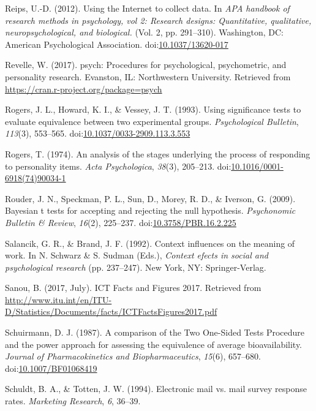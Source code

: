 \documentclass[english,man]{apa6}
\theoremstyle{definition}
\theoremstyle{definition}
\theoremstyle{definition}
\theoremstyle{remark}
\begin{document}
\hypertarget{ref-Reips2012}{}
Reips, U.-D. (2012). Using the Internet to collect data. In \emph{APA
handbook of research methods in psychology, vol 2: Research designs:
Quantitative, qualitative, neuropsychological, and biological.} (Vol. 2,
pp. 291--310). Washington, DC: American Psychological Association.
doi:\href{https://doi.org/10.1037/13620-017}{10.1037/13620-017}

\hypertarget{ref-Revelle2017}{}
Revelle, W. (2017). psych: Procedures for psychological, psychometric,
and personality research. Evanston, IL: Northwestern University.
Retrieved from \url{https://cran.r-project.org/package=psych}

\hypertarget{ref-Rogers1993}{}
Rogers, J. L., Howard, K. I., \& Vessey, J. T. (1993). Using
significance tests to evaluate equivalence between two experimental
groups. \emph{Psychological Bulletin}, \emph{113}(3), 553--565.
doi:\href{https://doi.org/10.1037/0033-2909.113.3.553}{10.1037/0033-2909.113.3.553}

\hypertarget{ref-Rogers1974}{}
Rogers, T. (1974). An analysis of the stages underlying the process of
responding to personality items. \emph{Acta Psychologica}, \emph{38}(3),
205--213.
doi:\href{https://doi.org/10.1016/0001-6918(74)90034-1}{10.1016/0001-6918(74)90034-1}

\hypertarget{ref-Rouder2009}{}
Rouder, J. N., Speckman, P. L., Sun, D., Morey, R. D., \& Iverson, G.
(2009). Bayesian t tests for accepting and rejecting the null
hypothesis. \emph{Psychonomic Bulletin \& Review}, \emph{16}(2),
225--237.
doi:\href{https://doi.org/10.3758/PBR.16.2.225}{10.3758/PBR.16.2.225}

\hypertarget{ref-Salancik1992}{}
Salancik, G. R., \& Brand, J. F. (1992). Context influences on the
meaning of work. In N. Schwarz \& S. Sudman (Eds.), \emph{Context efects
in social and psychological research} (pp. 237--247). New York, NY:
Springer-Verlag.

\hypertarget{ref-Sanou2017}{}
Sanou, B. (2017, July). ICT Facts and Figures 2017. Retrieved from
\url{http://www.itu.int/en/ITU-D/Statistics/Documents/facts/ICTFactsFigures2017.pdf}

\hypertarget{ref-Schuirmann1987}{}
Schuirmann, D. J. (1987). A comparison of the Two One-Sided Tests
Procedure and the power approach for assessing the equivalence of
average bioavailability. \emph{Journal of Pharmacokinetics and
Biopharmaceutics}, \emph{15}(6), 657--680.
doi:\href{https://doi.org/10.1007/BF01068419}{10.1007/BF01068419}

\hypertarget{ref-Schuldt1994}{}
Schuldt, B. A., \& Totten, J. W. (1994). Electronic mail vs. mail survey
response rates. \emph{Marketing Research}, \emph{6}, 36--39.
\end{document}
